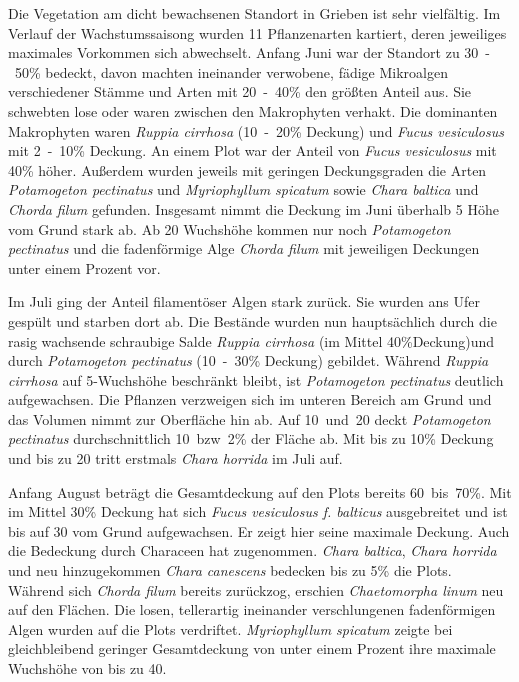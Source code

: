 Die Vegetation am dicht bewachsenen Standort in Grieben ist sehr vielfältig. Im Verlauf der Wachstumssaisong wurden 11 Pflanzenarten kartiert, deren jeweiliges maximales Vorkommen sich abwechselt. Anfang Juni war der Standort zu \unit{30-50}{\%} bedeckt, davon machten ineinander verwobene, fädige Mikroalgen verschiedener Stämme und Arten mit \unit{20-40}{\%} den größten Anteil aus. Sie schwebten lose oder waren zwischen den Makrophyten verhakt. Die dominanten Makrophyten waren \textit{Ruppia cirrhosa} (\unit{10-20}{\%} Deckung) und \textit{Fucus vesiculosus} mit \unit{2-10}{\%} Deckung. An einem Plot war der Anteil von \textit{Fucus vesiculosus} mit \unit{40}{\%} höher. Außerdem wurden jeweils mit geringen Deckungsgraden die Arten \textit{Potamogeton pectinatus} und \textit{Myriophyllum spicatum} sowie \textit{Chara baltica} und \textit{Chorda filum} gefunden. Insgesamt nimmt die Deckung im Juni überhalb \unit{5}{\centi\metre} Höhe vom Grund stark ab. Ab \unit{20}{\centi\metre} Wuchshöhe kommen nur noch \textit{Potamogeton pectinatus} und die fadenförmige Alge \textit{Chorda filum} mit jeweiligen Deckungen unter einem Prozent vor.

Im Juli ging der Anteil filamentöser Algen stark zurück. Sie wurden ans Ufer gespült und starben dort ab. Die Bestände wurden nun hauptsächlich durch die rasig wachsende schraubige Salde \textit{Ruppia cirrhosa} (im Mittel \unit{40}{\%}Deckung)und durch \textit{Potamogeton pectinatus} (\unit{10-30}{\%} Deckung) gebildet. Während \textit{Ruppia cirrhosa} auf \unit{5}{\centi\metre}-Wuchshöhe beschränkt bleibt, ist \textit{Potamogeton pectinatus} deutlich aufgewachsen. Die Pflanzen verzweigen sich im unteren Bereich am Grund und das Volumen nimmt zur Oberfläche hin ab. Auf \unit{10 und 20} {\centi\metre} deckt \textit{Potamogeton pectinatus} durchschnittlich \unit{10 bzw. 2}{\%} der Fläche ab. Mit bis zu \unit{10}{\%} Deckung und bis zu \unit{20}{\centi\metre} tritt erstmals \textit{Chara horrida} im Juli auf.

Anfang August beträgt die Gesamtdeckung auf den Plots bereits \unit{60 bis 70}{\%}. Mit im Mittel \unit{30}{\%} Deckung hat sich \textit{Fucus vesiculosus f. balticus} ausgebreitet und ist bis auf \unit{30}{\centi\metre} vom Grund aufgewachsen. Er zeigt hier seine maximale Deckung. Auch die Bedeckung durch Characeen hat zugenommen. \textit{Chara baltica}, \textit{Chara horrida} und neu hinzugekommen \textit{Chara canescens} bedecken bis zu \unit{5}{\%} die Plots. Während sich \textit{Chorda filum} bereits zurückzog, erschien \textit{Chaetomorpha linum} neu auf den Flächen. Die losen, tellerartig ineinander verschlungenen fadenförmigen Algen wurden auf die Plots verdriftet. \textit{Myriophyllum spicatum} zeigte bei gleichbleibend geringer Gesamtdeckung von unter einem Prozent ihre maximale Wuchshöhe von bis zu \unit{40}{\centi\metre}.

